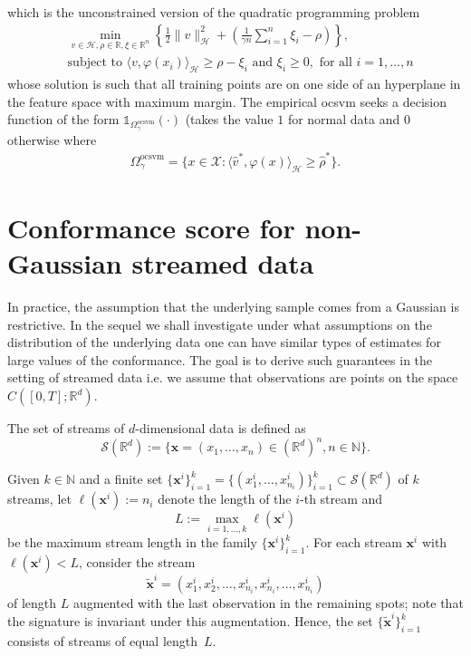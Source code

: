 \documentclass[twoside,11pt]{article}
\numberwithin{equation}{section}
\numberwithin{theorem}{section}
\newcommand{\R}{\mathbb{R}}
\newcommand{\X}{\mathcal{X}}
\newcommand{\N}{\mathbb{N}}
\newcommand{\h}{\mathcal{H}}
\begin{document}
which is the unconstrained version of the quadratic programming problem~\citep{xiao2017ramp, norton2017soft}
\begin{align*}
   &\min_{v\in \h,\rho\in \R,\xi \in \R^n}\left\{
   \frac{1}{2}\|v\|_{\h}^2
   + \left(\frac{1}{\gamma n}\sum_{i=1}^{n}\xi_i-\rho\right)\right\},\\
    &\text{subject to } \langle v, \varphi(x_i)\rangle_\h\geq \rho -\xi_i
    \text{ and } \xi_i\geq 0,\text{ for all }i=1,\ldots,n
\end{align*}
whose solution is such that all training points are on one side of an hyperplane in the feature space with maximum margin. The empirical \gls{ocsvm} seeks a decision function of the form $\mathds{1}_{\Omega^{\mathrm{ocsvm}}_\gamma}(\cdot)$ (takes the value $1$ for normal data and $0$ otherwise where
\begin{align*}
\Omega^{\mathrm{ocsvm}}_\gamma=\{x\in\X:\langle \hat{v}^*, \varphi(x)\rangle_\h\geq \hat{\rho}^*\}.
\end{align*}




\section{Conformance score for non-Gaussian streamed data}\label{Sec:Donsker}
In practice, the assumption that the underlying sample comes from a Gaussian is restrictive. In the sequel we shall investigate under what assumptions on the distribution of the underlying data one can have similar types of estimates for large values of the conformance. The goal is to derive such guarantees in the setting of streamed data i.e. we assume that observations are points on the space $C([0,T];\R^d)$.

\begin{definition} The set of streams of $d$-dimensional data is defined as 
$$
\mathcal{S}(\R^d)
:=\bigg\{ \mathbf{x}=(x_1,\dots, x_n)\in(\R^d)^n, n\in\N\bigg\}.
$$
\end{definition}
\noindent Given $k\in\N$ and a finite set $\{\mathbf{x}^i\}_{i=1}^{k}=\{(x^i_1, \dots, x^{i}_{n_i})\}_{i=1}^{k}\subset \mathcal{S}(\R^d)$ of $k$ streams, 
let $\ell(\mathbf{x}^i):=n_i$ denote the length of the $i$-th stream and
\begin{equation*}
    \label{eq:Ldef}
    L:=\max_{i=1,\dots, k}\ell(\mathbf{x}^i)
\end{equation*}
be the maximum stream length in the family 
$\{\mathbf{x}^i\}_{i=1}^{k}$. 
For each stream $\mathbf{x}^i$ with $\ell(\mathbf{x}^i)<L$, consider the stream
$$
\widetilde{\mathbf{x}}^i=\left(x^i_1, x^i_2,\dots, x^i_{n_i},x^i_{n_i}, \dots, x^i_{n_i}\right)
$$
of length $L$ augmented with the last observation in the remaining spots; note that the signature is invariant under this augmentation. Hence, the set $\{\widetilde{\mathbf{x}}^i\}_{i=1}^{k}$ consists of streams of equal length~$L$. 
\end{document}
